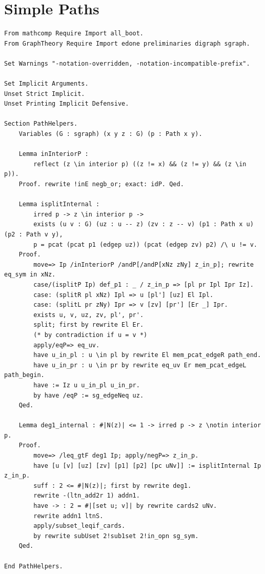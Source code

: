 \section{Simple Paths}\label{apdx:spath}
\begin{verbatim}
From mathcomp Require Import all_boot.
From GraphTheory Require Import edone preliminaries digraph sgraph.

Set Warnings "-notation-overridden, -notation-incompatible-prefix".

Set Implicit Arguments.
Unset Strict Implicit.
Unset Printing Implicit Defensive.

Section PathHelpers.
    Variables (G : sgraph) (x y z : G) (p : Path x y).

    Lemma inInteriorP :
        reflect (z \in interior p) ((z != x) && (z != y) && (z \in p)).
    Proof. rewrite !inE negb_or; exact: idP. Qed.

    Lemma isplitInternal : 
        irred p -> z \in interior p ->
        exists (u v : G) (uz : u -- z) (zv : z -- v) (p1 : Path x u) (p2 : Path v y),
        p = pcat (pcat p1 (edgep uz)) (pcat (edgep zv) p2) /\ u != v.
    Proof.
        move=> Ip /inInteriorP /andP[/andP[xNz zNy] z_in_p]; rewrite eq_sym in xNz.
        case/(isplitP Ip) def_p1 : _ / z_in_p => [pl pr Ipl Ipr Iz].
        case: (splitR pl xNz) Ipl => u [pl'] [uz] El Ipl. 
        case: (splitL pr zNy) Ipr => v [zv] [pr'] [Er _] Ipr.
        exists u, v, uz, zv, pl', pr'.
        split; first by rewrite El Er.
        (* by contradiction if u = v *)
        apply/eqP=> eq_uv.
        have u_in_pl : u \in pl by rewrite El mem_pcat_edgeR path_end.
        have u_in_pr : u \in pr by rewrite eq_uv Er mem_pcat_edgeL path_begin.
        have := Iz u u_in_pl u_in_pr.
        by have /eqP := sg_edgeNeq uz.
    Qed.

    Lemma deg1_internal : #|N(z)| <= 1 -> irred p -> z \notin interior p. 
    Proof.
        move=> /leq_gtF deg1 Ip; apply/negP=> z_in_p.
        have [u [v] [uz] [zv] [p1] [p2] [pc uNv]] := isplitInternal Ip z_in_p.
        suff : 2 <= #|N(z)|; first by rewrite deg1.
        rewrite -(ltn_add2r 1) addn1.
        have -> : 2 = #|[set u; v]| by rewrite cards2 uNv.
        rewrite addn1 ltnS. 
        apply/subset_leqif_cards.
        by rewrite subUset 2!sub1set 2!in_opn sg_sym.
    Qed.

End PathHelpers.


\end{verbatim}
